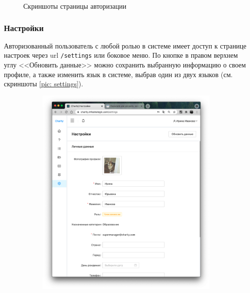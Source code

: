 \documentclass[a4paper,12pt,reqno]{article}
\begin{document}
\begin{figure}[H]
\begin{subfigure}[b]{0.475\linewidth}
		\end{subfigure}
		\caption{Скриншоты страницы авторизации}
		\label{pic: login}
	\end{figure}
	
	\subsubsection{Настройки} \label{sec: settings}
	
	Авторизованный пользователь с любой ролью в системе имеет доступ к странице  настроек через url \texttt{/settings} или боковое меню. По кнопке в правом верхнем углу <<Обновить данные>> можно сохранить выбранную информацию о своем профиле, а также изменить язык в системе, выбрав один из двух языков (см. скриншоты \ref{pic: settings}).
	
	\begin{figure}[H]
		\centering
		\begin{subfigure}[b]{0.475\linewidth}
			\includegraphics[width=\linewidth]{img/ro/settings.png}
		\end{subfigure}
		\begin{subfigure}[b]{0.475\linewidth}

\end{subfigure}
\end{figure}
\end{document}

